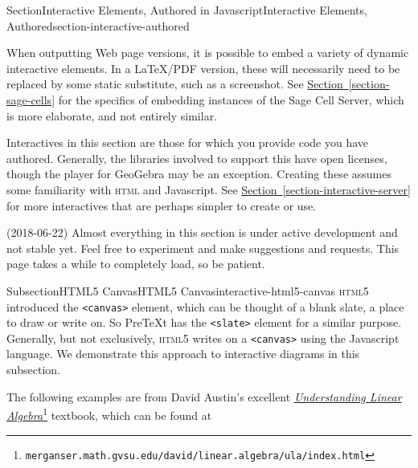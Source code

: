 \documentclass[twoside,10pt,]{article}
\newcommand{\xreffont}{\relax}
\newcommand{\mono}[1]{\texttt{#1}}
\newcommand{\initialism}[1]{\textsc{\MakeLowercase{#1}}}
\newcommand{\pubtitle}[1]{\textsl{#1}}
\numberwithin{equation}{section}
\begin{document}
\begin{sectionptx}{Section}{Interactive Elements, Authored in Javascript}{}{Interactive Elements, Authored}{}{}{section-interactive-authored}
%
%
\begin{introduction}{}%
When outputting Web page versions, it is possible to embed a variety of dynamic interactive elements.  In a \LaTeX{}\slash{}PDF version, these will necessarily need to be replaced by some static substitute, such as a screenshot.  See \hyperref[section-sage-cells]{Section~{\xreffont\ref{section-sage-cells}}} for the specifics of embedding instances of the Sage Cell Server, which is more elaborate, and not entirely similar.%
\par
Interactives in this section are those for which you provide code you have authored.  Generally, the libraries involved to support this have open licenses, though the player for GeoGebra may be an exception.  Creating these assumes some familiarity with \initialism{HTML} and Javascript.  See \hyperref[section-interactive-server]{Section~{\xreffont\ref{section-interactive-server}}} for more interactives that are perhaps simpler to create or use.%
\par
(2018-06-22) Almost everything in this section is under active development and not stable yet.  Feel free to experiment and make suggestions and requests.  This page takes a while to completely load, so be patient.%
\end{introduction}%
%
%
\typeout{************************************************}
\typeout{************************************************}
%
\begin{subsectionptx}{Subsection}{HTML5 Canvas}{}{HTML5 Canvas}{}{}{interactive-html5-canvas}
\initialism{HTML5} introduced the \mono{<canvas>} element, which can be thought of a blank slate, a place to draw or write on.  So PreTeXt has the \mono{<slate>} element for a similar purpose.  Generally, but not exclusively, \initialism{HTML5} writes on a \mono{<canvas>} using the Javascript language.  We demonstrate this approach to interactive diagrams in this subsection.%
\par
The following examples are from David Austin's excellent \href{http://merganser.math.gvsu.edu/david/linear.algebra/ula/index.html}{\pubtitle{Understanding Linear Algebra}}\footnote{\nolinkurl{merganser.math.gvsu.edu/david/linear.algebra/ula/index.html}\label{interactive-html5-canvas-3-2}} textbook, which can be found at%

\end{subsectionptx}
\end{sectionptx}
\end{document}

